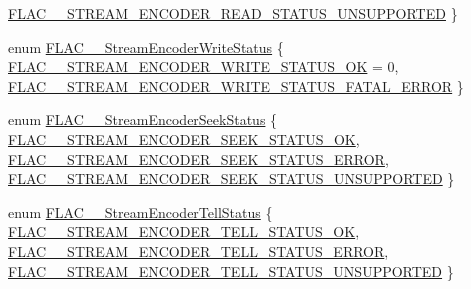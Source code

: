 \begin{DoxyCompactItemize}
\hyperlink{group__flac__stream__encoder_gga2e81f007fb0a7414c0bbb453f37ea37fa9bb730b8f6354cc1e810017a2f700316}{F\+L\+A\+C\+\_\+\+\_\+\+S\+T\+R\+E\+A\+M\+\_\+\+E\+N\+C\+O\+D\+E\+R\+\_\+\+R\+E\+A\+D\+\_\+\+S\+T\+A\+T\+U\+S\+\_\+\+U\+N\+S\+U\+P\+P\+O\+R\+T\+ED}
 \}
\item 
enum \hyperlink{group__flac__stream__encoder_ga3737471fd49730bb8cf9b182bdeda05e}{F\+L\+A\+C\+\_\+\+\_\+\+Stream\+Encoder\+Write\+Status} \{ \hyperlink{group__flac__stream__encoder_gga3737471fd49730bb8cf9b182bdeda05ea5622e0199f0203c402fcb7b4ca76f808}{F\+L\+A\+C\+\_\+\+\_\+\+S\+T\+R\+E\+A\+M\+\_\+\+E\+N\+C\+O\+D\+E\+R\+\_\+\+W\+R\+I\+T\+E\+\_\+\+S\+T\+A\+T\+U\+S\+\_\+\+OK} = 0, 
\hyperlink{group__flac__stream__encoder_gga3737471fd49730bb8cf9b182bdeda05ea18e7cd6a443fb8bd303c3ba89946bc85}{F\+L\+A\+C\+\_\+\+\_\+\+S\+T\+R\+E\+A\+M\+\_\+\+E\+N\+C\+O\+D\+E\+R\+\_\+\+W\+R\+I\+T\+E\+\_\+\+S\+T\+A\+T\+U\+S\+\_\+\+F\+A\+T\+A\+L\+\_\+\+E\+R\+R\+OR}
 \}
\item 
enum \hyperlink{group__flac__stream__encoder_ga6d5be3489f45fcf0c252022c65d87aca}{F\+L\+A\+C\+\_\+\+\_\+\+Stream\+Encoder\+Seek\+Status} \{ \hyperlink{group__flac__stream__encoder_gga6d5be3489f45fcf0c252022c65d87acaa99853066610d798627888ec2e5afa667}{F\+L\+A\+C\+\_\+\+\_\+\+S\+T\+R\+E\+A\+M\+\_\+\+E\+N\+C\+O\+D\+E\+R\+\_\+\+S\+E\+E\+K\+\_\+\+S\+T\+A\+T\+U\+S\+\_\+\+OK}, 
\hyperlink{group__flac__stream__encoder_gga6d5be3489f45fcf0c252022c65d87acaabf93227938b4e1bf3656fe4ba4159c60}{F\+L\+A\+C\+\_\+\+\_\+\+S\+T\+R\+E\+A\+M\+\_\+\+E\+N\+C\+O\+D\+E\+R\+\_\+\+S\+E\+E\+K\+\_\+\+S\+T\+A\+T\+U\+S\+\_\+\+E\+R\+R\+OR}, 
\hyperlink{group__flac__stream__encoder_gga6d5be3489f45fcf0c252022c65d87acaa8930179a426134caf30a70147448f037}{F\+L\+A\+C\+\_\+\+\_\+\+S\+T\+R\+E\+A\+M\+\_\+\+E\+N\+C\+O\+D\+E\+R\+\_\+\+S\+E\+E\+K\+\_\+\+S\+T\+A\+T\+U\+S\+\_\+\+U\+N\+S\+U\+P\+P\+O\+R\+T\+ED}
 \}
\item 
enum \hyperlink{group__flac__stream__encoder_gab628f63181250eb977a28bf12b7dd9ff}{F\+L\+A\+C\+\_\+\+\_\+\+Stream\+Encoder\+Tell\+Status} \{ \hyperlink{group__flac__stream__encoder_ggab628f63181250eb977a28bf12b7dd9ffa48e071d89494ac8f5471e7c0d7a6f43b}{F\+L\+A\+C\+\_\+\+\_\+\+S\+T\+R\+E\+A\+M\+\_\+\+E\+N\+C\+O\+D\+E\+R\+\_\+\+T\+E\+L\+L\+\_\+\+S\+T\+A\+T\+U\+S\+\_\+\+OK}, 
\hyperlink{group__flac__stream__encoder_ggab628f63181250eb977a28bf12b7dd9ffaf638882e04d7c58e6c29dcc7f410864b}{F\+L\+A\+C\+\_\+\+\_\+\+S\+T\+R\+E\+A\+M\+\_\+\+E\+N\+C\+O\+D\+E\+R\+\_\+\+T\+E\+L\+L\+\_\+\+S\+T\+A\+T\+U\+S\+\_\+\+E\+R\+R\+OR}, 
\hyperlink{group__flac__stream__encoder_ggab628f63181250eb977a28bf12b7dd9ffa9d6bbd317f85fd2d6fc72f64e3cb56e7}{F\+L\+A\+C\+\_\+\+\_\+\+S\+T\+R\+E\+A\+M\+\_\+\+E\+N\+C\+O\+D\+E\+R\+\_\+\+T\+E\+L\+L\+\_\+\+S\+T\+A\+T\+U\+S\+\_\+\+U\+N\+S\+U\+P\+P\+O\+R\+T\+ED}
 \}
\end{DoxyCompactItemize}

